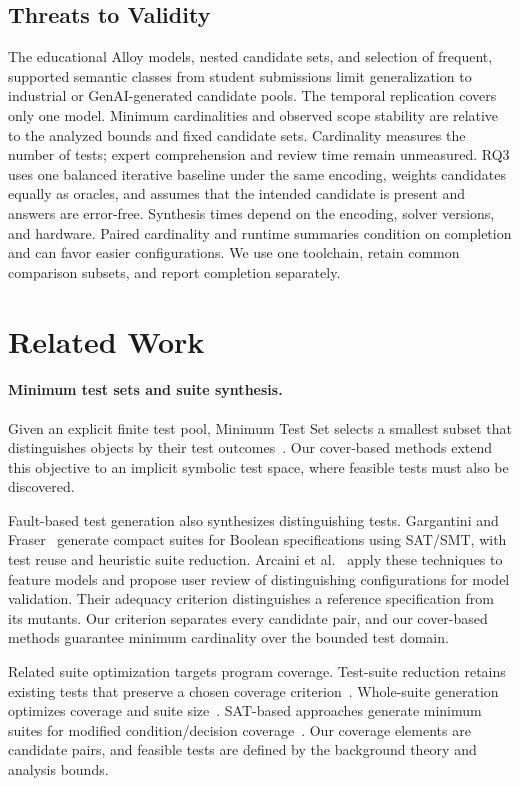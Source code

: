 \documentclass[runningheads]{llncs}
\begin{document}
\subsection{Threats to Validity}
The educational Alloy models, nested candidate sets, and selection of frequent,
supported semantic classes from student submissions limit generalization to
industrial or GenAI-generated candidate pools. The temporal replication
covers only one model. Minimum cardinalities and observed scope stability
are relative to the analyzed bounds and fixed candidate sets. Cardinality
measures the number of tests; expert comprehension and review time remain
unmeasured. RQ3 uses one balanced iterative baseline under the same encoding,
weights candidates equally as oracles, and assumes that the intended
candidate is present and answers are error-free. Synthesis times depend on
the encoding, solver versions, and hardware. Paired cardinality and runtime summaries condition
on completion and can favor easier configurations. We use one toolchain,
retain common comparison subsets, and report completion separately.

\section{Related Work}
\label{sec:related}

\paragraph{Minimum test sets and suite synthesis.}
Given an explicit finite test pool, Minimum Test Set selects a smallest subset
that distinguishes objects by their test
outcomes~\cite{GareyJohnson,moret1985minimizing}. Our cover-based methods extend
this objective to an implicit symbolic test space, where feasible tests must
also be discovered.

Fault-based test generation also synthesizes distinguishing tests. Gargantini
and Fraser~\cite{gargantini2011generating} generate compact suites for Boolean
specifications using SAT/SMT, with test reuse and heuristic suite reduction.
Arcaini et al.~\cite{arcaini2015generating} apply these techniques to feature
models and propose user review of distinguishing configurations for model
validation. Their adequacy criterion distinguishes a reference specification
from its mutants. Our criterion separates every candidate pair, and our
cover-based methods guarantee minimum cardinality over the bounded test domain.

Related suite optimization targets program coverage. Test-suite reduction
retains existing tests that preserve a chosen coverage
criterion~\cite{khan2018systematic,hsu2009mints}. Whole-suite generation
optimizes coverage and suite size~\cite{fraser2012whole}. SAT-based
approaches generate minimum suites for modified condition\slash decision
coverage~\cite{kitamura2018optimal,yang2018generating}. Our coverage elements
are candidate pairs, and feasible tests are defined by the background theory
and analysis bounds.
\end{document}
